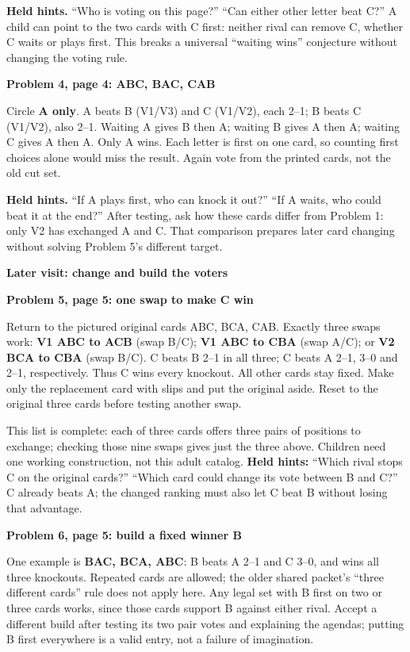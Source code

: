\documentclass[11pt]{article}
\newcommand{\head}[1]{\par\textbf{\large #1}\par}
\newcommand{\sub}[1]{\par\textbf{#1}\par}
\begin{document}
\textbf{Held hints.} ``Who is voting on this page?'' ``Can either other letter beat C?'' A child can point to the two cards with C first: neither rival can remove C, whether C waits or plays first. This breaks a universal ``waiting wins'' conjecture without changing the voting rule.

\sub{Problem 4, page 4: ABC, BAC, CAB}
Circle \textbf{A only}. A beats B (V1/V3) and C (V1/V2), each 2--1; B beats C (V1/V2), also 2--1. Waiting A gives B then A; waiting B gives A then A; waiting C gives A then A. Only A wins. Each letter is first on one card, so counting first choices alone would miss the result. Again vote from the printed cards, not the old cut set.

\textbf{Held hints.} ``If A plays first, who can knock it out?'' ``If A waits, who could beat it at the end?'' After testing, ask how these cards differ from Problem 1: only V2 has exchanged A and C. That comparison prepares later card changing without solving Problem 5's different target.

\newpage
\head{Later visit: change and build the voters}
\sub{Problem 5, page 5: one swap to make C win}
Return to the pictured original cards ABC, BCA, CAB. Exactly three swaps work: \textbf{V1 ABC to ACB} (swap B/C); \textbf{V1 ABC to CBA} (swap A/C); or \textbf{V2 BCA to CBA} (swap B/C). C beats B 2--1 in all three; C beats A 2--1, 3--0 and 2--1, respectively. Thus C wins every knockout. All other cards stay fixed. Make only the replacement card with slips and put the original aside. Reset to the original three cards before testing another swap.

This list is complete: each of three cards offers three pairs of positions to exchange; checking those nine swaps gives just the three above. Children need one working construction, not this adult catalog. \textbf{Held hints:} ``Which rival stops C on the original cards?'' ``Which card could change its vote between B and C?'' C already beats A; the changed ranking must also let C beat B without losing that advantage.

\sub{Problem 6, page 5: build a fixed winner B}
One example is \textbf{BAC, BCA, ABC}: B beats A 2--1 and C 3--0, and wins all three knockouts. Repeated cards are allowed; the older shared packet's ``three different cards'' rule does not apply here. Any legal set with B first on two or three cards works, since those cards support B against either rival. Accept a different build after testing its two pair votes and explaining the agendas; putting B first everywhere is a valid entry, not a failure of imagination.
\end{document}
